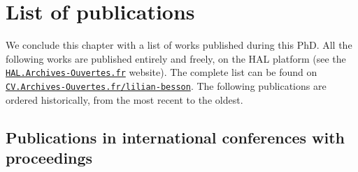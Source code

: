 \newpage


\section{List of publications}
\label{sec:1:listPublications}

We conclude this chapter with a list of works published during this PhD.
All the following works are published entirely and freely, on the HAL platform (see the \href{https://hal.archives-ouvertes.fr/}{\texttt{HAL.Archives-Ouvertes.fr}} website).
The complete list can be found on
\href{https://cv.archives-ouvertes.fr/lilian-besson/}{\texttt{CV.Archives-Ouvertes.fr/lilian-besson}}.
%
The following publications are ordered historically, from the most recent to the oldest.


\subsection*{Publications in international conferences with proceedings}


